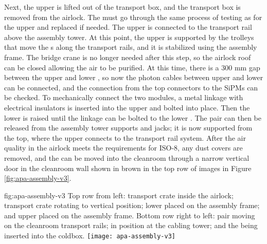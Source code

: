 Next, the upper  is lifted out of the transport box, and the transport box is removed from the airlock. The  must go through the same process of testing as for the upper  and replaced if needed. The upper  is connected to the transport rail above the  assembly tower. At this point, the upper  is supported by the trolleys that move the s along the transport rails, and it is stabilized using the  assembly frame. 
The bridge crane is no longer needed after this step, so the airlock roof can be closed allowing the air to be purified. At this time, there is a 300 \si{mm} gap between the upper and lower , so now the photon cables between upper and lower  can be connected, and the connection from the top connectors to the SiPMs can be checked. 
To mechanically connect the two  modules, a metal linkage with electrical insulators is inserted into the upper  and bolted into place. Then the lower  is raised until the linkage can be bolted to the lower .  
The  pair can then be released from the assembly tower supports and jacks; it is now supported from the top, where the upper  connects to the transport rail system.
After the air quality in the airlock meets the requirements for ISO-8, any dust covers are removed, and the  can be moved into the cleanroom through a narrow vertical door in the cleanroom wall shown in brown in the top row of images in Figure \ref{fig:apa-assembly-v3}.


\begin{dunefigure}{fig:apa-assembly-v3}
  {Top row from left:   transport crate inside the airlock;  transport crate rotating to vertical position;  lower  placed on the  assembly frame; and upper  placed on the assembly frame. Bottom row right to left:  pair moving on the cleanroom transport rails;  in  position at the cabling tower; and the  being inserted into the coldbox.}
\texttt{[image: apa-assembly-v3]}

\end{dunefigure}

